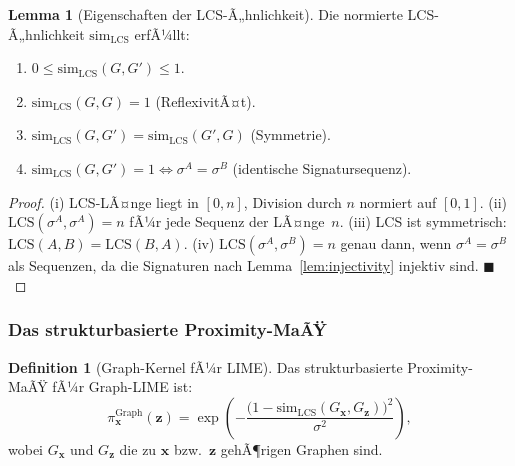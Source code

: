 ﻿\documentclass[a4paper,12pt]{article}
\theoremstyle{definition}
\newtheorem{definition}{Definition}[section]
\newtheorem{lemma}{Lemma}[section]
\begin{document}
\begin{lemma}[Eigenschaften der LCS-Ã„hnlichkeit]
  Die normierte LCS-Ã„hnlichkeit $\mathrm{sim}_{\mathrm{LCS}}$ erfÃ¼llt:
  \begin{enumerate}
    \item $0 \leq \mathrm{sim}_{\mathrm{LCS}}(G, G') \leq 1$.
    \item $\mathrm{sim}_{\mathrm{LCS}}(G, G) = 1$ (ReflexivitÃ¤t).
    \item $\mathrm{sim}_{\mathrm{LCS}}(G, G') = \mathrm{sim}_{\mathrm{LCS}}(G', G)$ (Symmetrie).
    \item $\mathrm{sim}_{\mathrm{LCS}}(G, G') = 1 \Leftrightarrow \sigma^A = \sigma^B$
          (identische Signatursequenz).
  \end{enumerate}
\end{lemma}

\begin{proof}
  (i) LCS-LÃ¤nge liegt in $[0, n]$, Division durch $n$ normiert auf $[0, 1]$.
  (ii) $\mathrm{LCS}(\sigma^A, \sigma^A) = n$ fÃ¼r jede Sequenz der LÃ¤nge~$n$.
  (iii) LCS ist symmetrisch: $\mathrm{LCS}(A, B) = \mathrm{LCS}(B, A)$.
  (iv) $\mathrm{LCS}(\sigma^A, \sigma^B) = n$ genau dann, wenn $\sigma^A = \sigma^B$
       als Sequenzen, da die Signaturen nach Lemma~\ref{lem:injectivity} injektiv
       sind. \hfill$\blacksquare$
\end{proof}

\subsubsection{Das strukturbasierte Proximity-MaÃŸ}

\begin{definition}[Graph-Kernel fÃ¼r LIME]
  Das strukturbasierte Proximity-MaÃŸ fÃ¼r Graph-LIME ist:
  \begin{equation}
    \pi_\mathbf{x}^{\mathrm{Graph}}(\mathbf{z})
    = \exp\!\left(-\frac{\bigl(1 - \mathrm{sim}_{\mathrm{LCS}}(G_\mathbf{x}, G_\mathbf{z})\bigr)^2}{\sigma^2}\right),
    \label{eq:graph_kernel}
  \end{equation}
  wobei $G_\mathbf{x}$ und $G_\mathbf{z}$ die zu $\mathbf{x}$ bzw.\ $\mathbf{z}$
  gehÃ¶rigen Graphen sind.
\end{definition}
\end{document}
